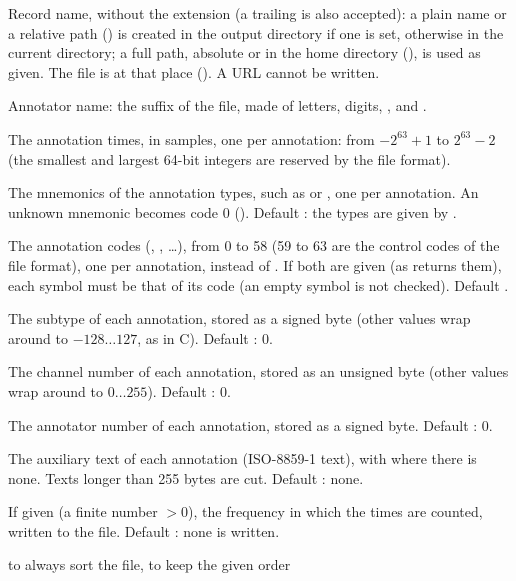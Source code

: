 \begin{params}
\item[record] Record name, without the  extension (a trailing  is
  also accepted): a plain name or a relative path () is created in the
  output directory if one is set, otherwise in the current directory; a full path,
  absolute or in the home directory (), is used as
  given. The file is  at that place (). A URL
  cannot be written.
\item[annotator] Annotator name: the suffix of the file, made of letters, digits,
  \code{\_}, \code{-} and \code{\textasciitilde}.
\item[samples] The annotation times, in samples, one per annotation: from $-2^{63} + 1$ to
  $2^{63} - 2$ (the smallest and largest 64-bit integers are reserved by the file
  format).
\item[symbols] The mnemonics of the annotation types, such as  or ,
  one per annotation. An unknown mnemonic becomes code 0 (). Default
  : the types are given by .
\item[codes] The annotation codes (, , \ldots), from 0 to 58 (59 to
  63 are the control codes of the file format), one per annotation, instead of
  . If both are given (as  returns them),
  each symbol must be that of its code (an empty symbol is not checked). Default
  .
\item[subtypes] The subtype of each annotation, stored as a signed byte (other values wrap
  around to $-128 \ldots 127$, as in C). Default : 0.
\item[chans] The channel number of each annotation, stored as an unsigned byte (other
  values wrap around to $0 \ldots 255$). Default : 0.
\item[nums] The annotator number of each annotation, stored as a signed byte. Default
  : 0.
\item[aux] The auxiliary text of each annotation (ISO-8859-1 text), with 
  where there is none. Texts longer than 255 bytes are cut. Default : none.
\item[fs] If given (a finite number $> 0$), the frequency in which the times are counted,
  written to the file. Default : none is written.
\item[sort]  to always sort the file,  to keep the given order

\end{params}
